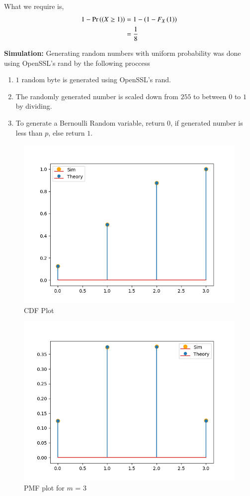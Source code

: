 \documentclass[journal]{IEEEtran}
\begin{document}
What we require is,
\begin{align}
  1 - \Pr\left(\left(X \ge 1\right)\right) &= 1 - \left(1 - F_X\left(1\right) \right) \\
   &= \frac{1}{8}
\end{align}

\textbf{Simulation:}\newline
Generating random numbers with uniform probability was done using OpenSSL's rand by the following proccess
\begin{enumerate}
  \item $1$ random byte is generated using OpenSSL's rand. 
  \item The randomly generated number is scaled down from $255$ to between $0$ to $1$ by dividing. 
  \item To generate a Bernoulli Random variable, return 0, if generated number is less than $p$, else return $1$.
\end{enumerate}
\begin{figure}[h!]
  \centering
  \includegraphics[width=0.7\columnwidth]{figs/cdf.png}
  \caption{CDF Plot}
  \label{label}
\end{figure}

\begin{figure}[h!]
  \centering
  \includegraphics[width=0.7\columnwidth]{figs/pmf_1.png}
  \caption{PMF plot for $m$ = 3}
  \label{label}
\end{figure}
\end{document}
